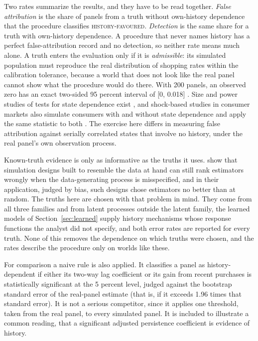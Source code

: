 \documentclass[11pt]{article}
\newcommand{\verdict}[1]{\textsc{#1}}
\begin{document}
Two rates summarize the results, and they have to be read together. \emph{False attribution}
is the share of panels from a truth without own-history dependence that the procedure
classifies \verdict{history-favoured}. \emph{Detection} is the same share for a truth with
own-history dependence. A procedure that never names history has a perfect false-attribution
record and no detection, so neither rate means much alone. A truth enters the evaluation only
if it is \emph{admissible}: its simulated population must reproduce the real distribution of
shopping rates within the calibration tolerance, because a world that does not look like the
real panel cannot show what the procedure would do there. With 200 panels, an observed zero
has an exact two-sided 95 percent interval of [0, 0.018] \citep{clopper_pearson}. Size and power studies of
tests for state dependence exist \citep{bartolucci2018}, and shock-based studies in consumer
markets also simulate consumers with and without state dependence and apply the same statistic
to both \citep{levine_seiler,kotschedoff2025}. The exercise here differs in measuring false
attribution against serially correlated states that involve no history, under the real panel's
own observation process.

Known-truth evidence is only as informative as the truths it uses. \citet{advani2019} show
that simulation designs built to resemble the data at hand can still rank estimators wrongly
when the data-generating process is misspecified, and in their application, judged by bias,
such designs chose estimators no better than at random. The truths here are chosen with that
problem in mind. They come from all three families and from latent processes outside the latent
family, the learned models of Section~\ref{sec:learned} supply history mechanisms whose response
functions the analyst did not specify, and both error rates are reported for every truth. None
of this removes the dependence on which truths were chosen, and the rates describe the procedure
only on worlds like these.

For comparison a naive rule is also applied. It classifies a panel as history-dependent if
either its two-way lag coefficient or its gain from recent purchases is statistically significant at the 5
percent level, judged against the bootstrap standard error of the real-panel estimate (that
is, if it exceeds 1.96 times that standard error). It is not a serious competitor, since it applies one threshold,
taken from the real panel, to every simulated panel. It is included to illustrate a common
reading, that a significant adjusted persistence coefficient is evidence of history.
\end{document}
